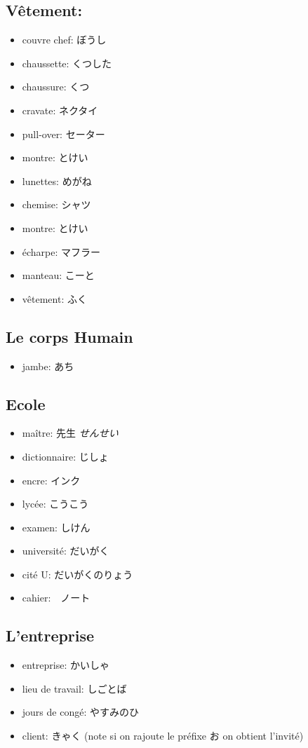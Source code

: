 \documentclass{article}
\begin{document}
\begin{CJK}{UTF8}{min}
   \subsection{Vêtement:}
   \begin{itemize}
       \item couvre chef: ぼうし
       \item chaussette: くつした
        \item chaussure: くつ
        \item cravate: ネクタイ
        \item pull-over: セーター
        \item montre: とけい
        \item lunettes: めがね
        \item chemise: シャツ
        \item montre: とけい
        \item écharpe: マフラー
        \item manteau: こーと
        \item vêtement: ふく
   \end{itemize}

   \subsection{Le corps Humain}
   \begin{itemize}
       \item jambe: あち
   \end{itemize}

    \subsection{Ecole}
   \begin{itemize}
       \item maître: 先生 \textit{せんせい}
       \item dictionnaire: じしょ
       \item encre: インク
       \item lycée: こうこう
       \item examen: しけん
       \item université: だいがく
       \item cité U: だいがくのりょう
       \item cahier:　ノート
   \end{itemize}

   \subsection{L'entreprise}
   \begin{itemize}
       \item entreprise: かいしゃ
        \item lieu de travail: しごとば
        \item jours de congé: やすみのひ
        \item client: きゃく (note si on rajoute le préfixe お on obtient l'invité)
   \end{itemize}


\end{CJK}
\end{document}
